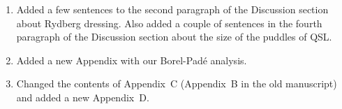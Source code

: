 \documentclass[
onecolumn,
superscriptaddress,
longbibliography,
nofootinbib,
 amsmath,amssymb,
 aps,
prb
]{revtex4-2}
\begin{document}
\begin{enumerate}
    \begin{enumerate}
        \item Added subsections explaining the behavior of each correlator in each phase of the phase diagram.
        \item Changed the definition of the plaquette operators. For example the definition of the plaquette X operator was changed from a product of $\hat{S}^{\pm}$ to a product of $\hat{S}^x$ as these definitions  make the explanations clearer. Also changed from the disconnected plaquette correlators to the connected plaquette correlators.
        \item Entries in Table II were updated.
        \item Changed BFFM to Fredenhagen-Marcu everywhere in the manuscript. Clarified that we are using the real-space version above Eq.~(82).
        \item Added details to the  caption of Fig. 13. Submitted a 3D animation of the gauge field configuration.
    \end{enumerate}
    \item Added a few sentences to the second paragraph of the Discussion section about Rydberg dressing. Also added a couple of sentences in the fourth paragraph of the Discussion section about the size of the puddles of QSL.
    \item Added a new Appendix with our Borel-Pad\'e analysis.
    \item Changed the contents of Appendix~C (Appendix~B in the old manuscript) and added a new Appendix~D.
\end{enumerate}


\end{document}
